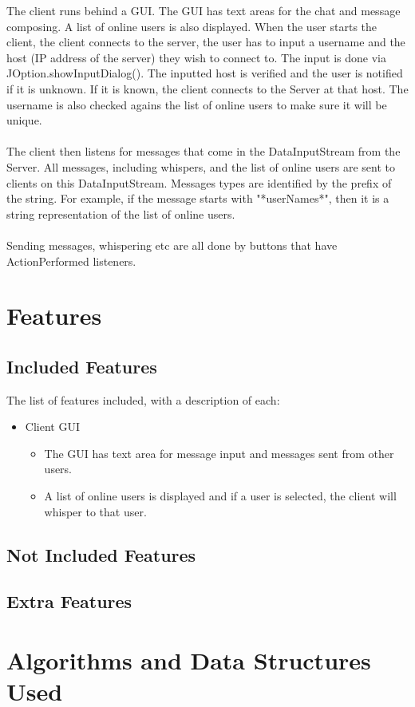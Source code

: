 \documentclass[11pt]{article}
\begin{document}
The client runs behind a GUI. The GUI has text areas for the chat and message
composing. A list of online users is also displayed. When the user starts the
client, the client connects to the server, the user has to input a username and the host (IP
address of the server) they wish to connect to. The input is done via JOption.showInputDialog().
The inputted host is verified and the user is notified if it is unknown. If it is known, the client
connects to the Server at that host. The username is also checked agains the list of online users to
make sure it will be unique.
\\\\
The client then listens for messages that come in the DataInputStream from the Server.
All messages, including whispers, and the list of online users are sent to clients on
this DataInputStream. Messages types are identified by the prefix of the string. For
example, if the message starts with "*userNames*", then it is a string representation
of the list of online users.
\\\\
Sending messages, whispering etc are all done by buttons that have ActionPerformed
listeners.

\section{Features}

\subsection{Included Features}

The list of features included, with a description of each:

\begin{itemize}
  \item Client GUI
  \begin{itemize}
    \item The GUI has text area for message input and messages sent from other users.
    \item A list of online users is displayed and if a user is selected, the client will
    whisper to that user.
  \end{itemize}
\end{itemize}

\subsection{Not Included Features}

\subsection{Extra Features}

\section{Algorithms and Data Structures Used}
\end{document}
